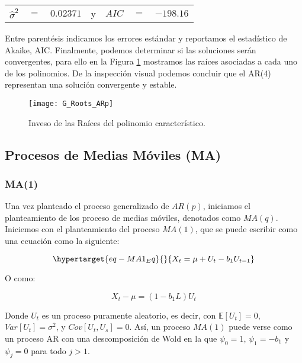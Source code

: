 \documentclass[
  a4paper,
]{article}
\begin{document}
\begin{center}
\begin{tabular}{ c c c c c c c } 
    $\hat{\sigma}^2$ & $=$ & $0.02371$ & y & $AIC$ & $=$ & $-198.16$ 
\end{tabular}
\end{center}

Entre parentésis indicamos los errores estándar y reportamos el
estadístico de Akaike, AIC. Finalmente, podemos determinar si las
soluciones serán convergentes, para ello en la Figura \ref{G_Roots_ARp}
mostramos las raíces asociadas a cada uno de los polinomios. De la
inspección visual podemos concluir que el AR(4) representan una solución
convergente y estable.

\begin{figure}
  \centering
    \texttt{[image: G\_Roots\_ARp]}
  \caption{Inveso de las Raíces del polinomio característico.}
  \label{G_Roots_ARp}
\end{figure}

\hypertarget{procesos-de-medias-muxf3viles-ma}{%
\subsection{Procesos de Medias Móviles
(MA)}\label{procesos-de-medias-muxf3viles-ma}}

\hypertarget{ma1}{%
\subsubsection{MA(1)}\label{ma1}}

Una vez planteado el proceso generalizado de \(AR(p)\), iniciamos el
planteamiento de los proceso de medias móviles, denotados como
\(MA(q)\). Iniciemos con el planteamiento del proceso \(MA(1)\), que se
puede escribir como una ecuación como la siguiente:

\begin{equation}\protect\hypertarget{eq-MA1_Eq}{}{
X_t = \mu + U_t - b_1 U_{t-1}
}\label{eq-MA1_Eq}\end{equation}

O como:

\[
X_t - \mu = (1 - b_1 L) U_{t}
\]

Donde \(U_t\) es un proceso puramente aleatorio, es decir, con
\(\mathbb{E}[U_t] = 0\), \(Var[U_t] = \sigma^2\), y
\(Cov[U_t, U_s] = 0\). Así, un proceso \(MA(1)\) puede verse como un
proceso AR con una descomposición de Wold en la que \(\psi_0 = 1\),
\(\psi_1 = - b_1\) y \(\psi_j = 0\) para todo \(j > 1\).
\end{document}
